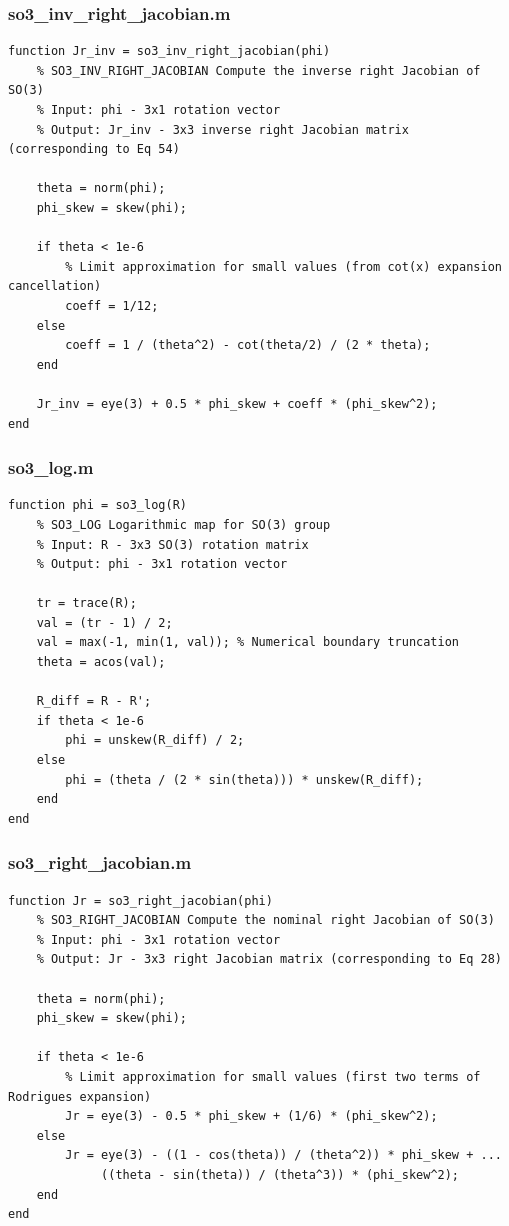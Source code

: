 \documentclass[twocolumn,10pt]{article}
\begin{document}
\subsubsection{so3\_inv\_right\_jacobian.m}
\begin{lstlisting}
function Jr_inv = so3_inv_right_jacobian(phi)
    % SO3_INV_RIGHT_JACOBIAN Compute the inverse right Jacobian of SO(3)
    % Input: phi - 3x1 rotation vector
    % Output: Jr_inv - 3x3 inverse right Jacobian matrix (corresponding to Eq 54)
    
    theta = norm(phi);
    phi_skew = skew(phi);
    
    if theta < 1e-6
        % Limit approximation for small values (from cot(x) expansion cancellation)
        coeff = 1/12;
    else
        coeff = 1 / (theta^2) - cot(theta/2) / (2 * theta);
    end
    
    Jr_inv = eye(3) + 0.5 * phi_skew + coeff * (phi_skew^2);
end
\end{lstlisting}

\subsubsection{so3\_log.m}
\begin{lstlisting}
function phi = so3_log(R)
    % SO3_LOG Logarithmic map for SO(3) group
    % Input: R - 3x3 SO(3) rotation matrix
    % Output: phi - 3x1 rotation vector
    
    tr = trace(R);
    val = (tr - 1) / 2;
    val = max(-1, min(1, val)); % Numerical boundary truncation
    theta = acos(val);
    
    R_diff = R - R';
    if theta < 1e-6
        phi = unskew(R_diff) / 2;
    else
        phi = (theta / (2 * sin(theta))) * unskew(R_diff);
    end
end
\end{lstlisting}

\subsubsection{so3\_right\_jacobian.m}
\begin{lstlisting}
function Jr = so3_right_jacobian(phi)
    % SO3_RIGHT_JACOBIAN Compute the nominal right Jacobian of SO(3)
    % Input: phi - 3x1 rotation vector
    % Output: Jr - 3x3 right Jacobian matrix (corresponding to Eq 28)
    
    theta = norm(phi);
    phi_skew = skew(phi);
    
    if theta < 1e-6
        % Limit approximation for small values (first two terms of Rodrigues expansion)
        Jr = eye(3) - 0.5 * phi_skew + (1/6) * (phi_skew^2);
    else
        Jr = eye(3) - ((1 - cos(theta)) / (theta^2)) * phi_skew + ...
             ((theta - sin(theta)) / (theta^3)) * (phi_skew^2);
    end
end
\end{lstlisting}
\end{document}
